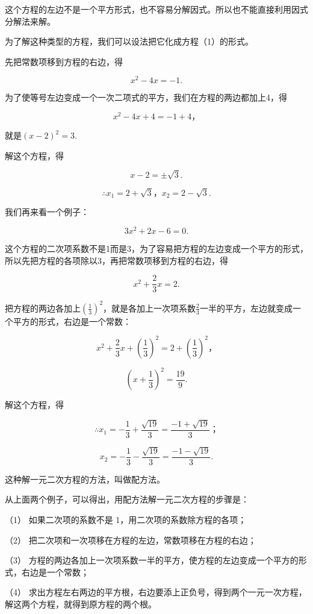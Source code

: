 这个方程的左边不是一个平方形式，也不容易分解因式。所以也不能直接利用因式分解法来解。

为了解这种类型的方程，我们可以设法把它化成方程（1）的形式。

先把常数项移到方程的右边，得

\[
x ^ {2} - 4 x = - 1.
\]

为了使等号左边变成一个一次二项式的平方，我们在方程的两边都加上4，得

\[
x ^ {2} - 4 x + 4 = - 1 + 4\text{，}
\]

就是\((x - 2)^{2} = 3.\)

解这个方程，得

\[
x - 2 = \pm \sqrt {3}.
\]

\[
\therefore x _ {1} = 2 + \sqrt {3}\text{，} x _ {2} = 2 - \sqrt {3}.
\]

我们再来看一个例子：

\[
3 x ^ {2} + 2 x - 6 = 0.
\]

这个方程的二次项系数不是1而是3，为了容易把方程的左边变成一个平方的形式，所以先把方程的各项除以3，再把常数项移到方程的右边，得

\[
x ^ {2} + \frac{2}{3} x = 2.
\]

把方程的两边各加上\(\left(\frac{1}{3}\right)^2\)，就是各加上一次项系数\(\frac{2}{3}\)一半的平方，左边就变成一个平方的形式，右边是一个常数：

\[
x ^ {2} + \frac{2}{3} x + \left(\frac{1}{3}\right) ^ {2} = 2 + \left(\frac{1}{3}\right) ^ {2}\text{，}
\]

\[
\left(x + \frac{1}{3}\right) ^ {2} = \frac{19}{9}.
\]

解这个方程，得

\[
\therefore x _ {1} = - \frac{1}{3} + \frac{\sqrt {19}}{3} = \frac{- 1 + \sqrt {19}}{3}\text{；}
\]

\[
x _ {2} = - \frac{1}{3} - \frac{\sqrt {19}}{3} = \frac{- 1 - \sqrt {19}}{3}.
\]

这种解一元二次方程的方法，叫做配方法。

从上面两个例子，可以得出，用配方法解一元二次方程的步骤是：

（1） 如果二次项的系数不是 1，用二次项的系数除方程的各项；

（2） 把二次项和一次项移在方程的左边，常数项移在方程的右边；

（3）
方程的两边各加上一次项系数一半的平方，使方程的左边变成一个平方的形式，右边是一个常数；

（4）
求出方程左右两边的平方根，右边要添上正负号，得到两个一元一次方程，解这两个方程，就得到原方程的两个根。


